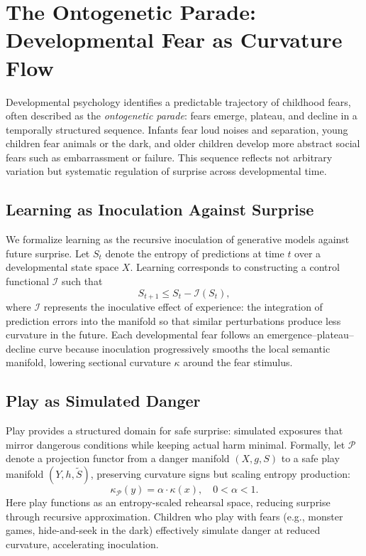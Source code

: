\documentclass{article}
\theoremstyle{definition}
\begin{document}
\section{The Ontogenetic Parade: Developmental Fear as Curvature Flow}

Developmental psychology identifies a predictable trajectory of childhood fears,
often described as the \emph{ontogenetic parade}: fears emerge, plateau, and
decline in a temporally structured sequence. Infants fear loud noises and
separation, young children fear animals or the dark, and older children develop
more abstract social fears such as embarrassment or failure. This sequence
reflects not arbitrary variation but systematic regulation of surprise across
developmental time.

\subsection{Learning as Inoculation Against Surprise}

We formalize learning as the recursive inoculation of generative models against
future surprise. Let $S_t$ denote the entropy of predictions at time $t$ over a
developmental state space $X$. Learning corresponds to constructing a control
functional $\mathcal{I}$ such that
\[
S_{t+1} \leq S_t - \mathcal{I}(S_t),
\]
where $\mathcal{I}$ represents the inoculative effect of experience: the
integration of prediction errors into the manifold so that similar perturbations
produce less curvature in the future. Each developmental fear follows an
emergence--plateau--decline curve because inoculation progressively smooths the
local semantic manifold, lowering sectional curvature $\kappa$ around the fear
stimulus.

\subsection{Play as Simulated Danger}

Play provides a structured domain for safe surprise: simulated exposures that
mirror dangerous conditions while keeping actual harm minimal. Formally, let
$\mathcal{P}$ denote a projection functor from a danger manifold
$(X, g, S)$ to a safe play manifold $(Y, h, \tilde S)$, preserving curvature
signs but scaling entropy production:
\[
\kappa_{\mathcal{P}}(y) = \alpha \cdot \kappa(x), \quad 0 < \alpha < 1.
\]
Here play functions as an entropy-scaled rehearsal space, reducing surprise
through recursive approximation. Children who play with fears (e.g., monster
games, hide-and-seek in the dark) effectively simulate danger at reduced
curvature, accelerating inoculation.
\end{document}
